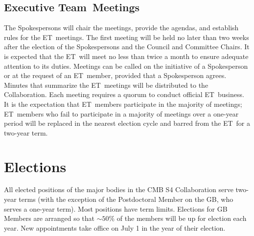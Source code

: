 \documentclass[12pt]{article}
\newcommand{\exec}{{Executive Team}}
\newcommand{\shorte}{{ET}}  %
\begin{document}


\subsection{\exec \ Meetings}

The Spokespersons will chair the meetings, provide the agendas, and establish rules for the \shorte\ meetings. The first meeting will be held no later than two weeks after the election of the Spokespersons and the Council and Committee Chairs. It is expected that the \shorte\ will meet no less than twice a month to ensure adequate attention to its duties. Meetings can be called on the initiative of a Spokesperson or at the request of an \shorte\ member, provided that a Spokesperson agrees. Minutes that summarize the \shorte\ meetings will be distributed to the Collaboration. Each meeting requires a quorum to conduct official \shorte\ business.  It is the expectation that \shorte\ members participate in the majority of meetings; \shorte\ members who fail to participate %
in a majority of meetings over a one-year period will be replaced in the nearest election cycle and barred from the \shorte\ for a two-year term.  


\section{Elections}\label{sec:elections}
All elected positions of the major bodies in the CMB S4 Collaboration serve two-year terms (with the exception of the Postdoctoral Member on the GB, who serves a one-year term). Most positions have term limits.  Elections for %
GB Members are  arranged so that $\sim 50\%$ of the members will be up for election each year.
New appointments take office on July 1 in the year of their election.  

\end{document}
